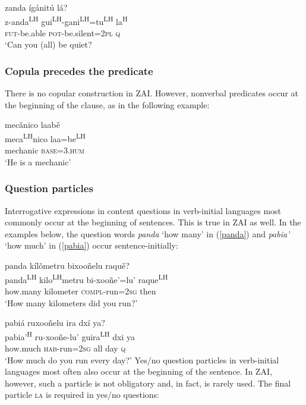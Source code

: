 \ea\label{auxmain}
zanda \'{i}g\'{a}nit\'{u} l\'{a}? \\
z-anda\textsuperscript{LH} gui\textsuperscript{LH}-gani\textsuperscript{LH}=tu\textsuperscript{LH} la\textsuperscript{H} \\
\textsc{fut}-be.able \textsc{pot}-be.silent=\textsc{2pl} \textsc{q} \\
\glt `Can you (all) be quiet?
\z


\subsubsection{Copula precedes the predicate} 

There is no copular construction in ZAI. However, nonverbal predicates occur at the beginning of the clause, as in the following example:

\ea
\glll mec\v{a}nico laab\v{e} \\
meca\textsuperscript{LH}nico laa=be\textsuperscript{LH} \\
mechanic \textsc{base}=\textsc{3.hum} \\
\glt `He is a mechanic'
\z



\subsubsection{Question particles}

Interrogative expressions in content questions in verb-initial languages most commonly occur at the beginning of sentences. This is true in ZAI as well. In the examples below, the question words \textit{panda} `how many' in (\ref{panda}) and \textit{pabia'} `how much' in (\ref{pabia}) occur sentence-initially:

\ea\label{panda}
panda k\'{i}l\v{o}metru bixooñelu raqu\v{e}?  \\
panda\textsuperscript{LH} kilo\textsuperscript{LH}metru bi-xooñe'=lu' raque\textsuperscript{LH} \\
how.many kilometer \textsc{compl}-run=\textsc{2sg} then \\
\glt `How many kilometers did you run?'
\z

\ea\label{pabia}
pabi\'{a} ruxooñelu ira dx\'{i} ya? \\
pabia'\textsuperscript{H} ru-xooñe-lu' guira\textsuperscript{LH} dxi ya \\
how.much \textsc{hab}-run=\textsc{2sg} all day \textsc{q} \\
\glt `How much do you run every day?'	
\z
Yes/no question particles in verb-initial languages most often also occur at the beginning of the sentence. In ZAI, however, such a particle is not obligatory and, in fact, is rarely used. The final particle \textsc{la} is required in yes/no questions:

